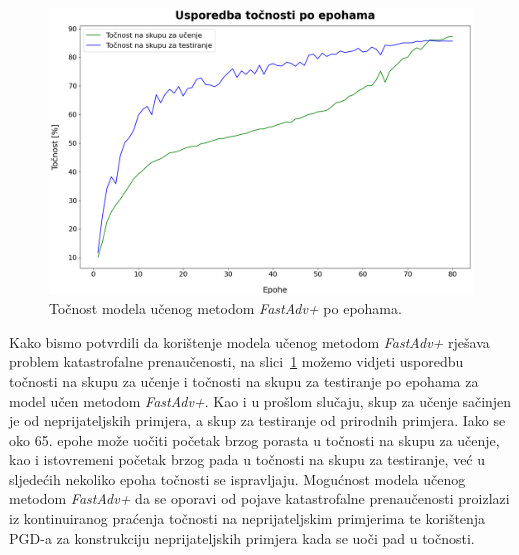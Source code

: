 \documentclass[times, utf8, zavrsni, numeric]{fer}
\begin{document}
\pagebreak
\begin{figure}[htb]
    \centering
    \includegraphics[scale=0.41]{../stats/resnet18_fast+_epochs_80_lr_0.2_early/accuracies.png}
    \caption{Točnost modela učenog metodom \textit{FastAdv+} po epohama.}
    \label{fig:fast_plus_acc}
\end{figure}

Kako bismo potvrdili da korištenje modela učenog metodom \textit{FastAdv+} rješava problem katastrofalne prenaučenosti, 
na slici~\ref{fig:fast_plus_acc} možemo vidjeti usporedbu točnosti na skupu za učenje i točnosti na skupu za testiranje po epohama za model učen metodom \textit{FastAdv+}.
Kao i u prošlom slučaju, skup za učenje sačinjen je od neprijateljskih primjera, a skup za testiranje od prirodnih primjera.
Iako se oko 65. epohe može uočiti početak brzog porasta u točnosti na skupu za učenje, kao i istovremeni početak brzog pada u točnosti na skupu za testiranje,
već u sljedećih nekoliko epoha točnosti se ispravljaju. 
Mogućnost modela učenog metodom \textit{FastAdv+} da se oporavi od pojave katastrofalne prenaučenosti proizlazi iz kontinuiranog praćenja točnosti na neprijateljskim primjerima 
te korištenja PGD-a za konstrukciju neprijateljskih primjera kada se uoči pad u točnosti.

\end{document}
